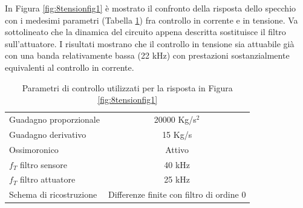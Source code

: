 In Figura \ref{fig:8tensionfig1} è mostrato il confronto della risposta dello specchio con i medesimi parametri (Tabella \ref{tab:8tensionfig1}) fra controllo in corrente e in tensione. Va sottolineato che la dinamica del circuito appena descritta sostituisce il filtro sull'attuatore. I risultati mostrano che il controllo in tensione sia attuabile già con una banda relativamente bassa (22 kHz) con prestazioni sostanzialmente equivalenti al controllo in corrente. 



\begin{table}[h]
\centering
\footnotesize
\begin{tabular}{lc}
\toprule
Guadagno proporzionale & 20000 Kg/s$^2$\\
Guadagno derivativo & 15 Kg/s\\
Ossimoronico & Attivo\\
$f_T$ filtro sensore & 40 kHz\\
$f_T$ filtro attuatore & 25 kHz\\
Schema di ricostruzione & Differenze finite con filtro di ordine $0$\\
\bottomrule
\end{tabular}
\caption{Parametri di controllo utilizzati per la risposta in Figura \ref{fig:8tensionfig1}}
\label{tab:8tensionfig1}
\end{table}
